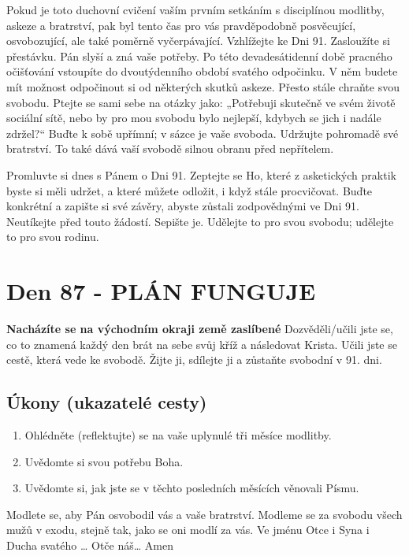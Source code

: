 \documentclass[11pt]{article}
\newcommand{\zacatekTrinactyTyden}{
\textbf{Nacházíte se na východním okraji země zaslíbené} \newline 
Dozvěděli/učili jste se, co to znamená každý den brát na sebe svůj kříž a následovat Krista. Učili jste se cestě, která vede ke svobodě. Žijte ji, sdílejte ji a zůstaňte svobodní v 91. dni.

\subsection*{Úkony (ukazatelé cesty)}
\begin{enumerate}
  \item Ohlédněte (reflektujte) se na vaše uplynulé tři měsíce modlitby.
  \item Uvědomte si svou potřebu Boha.
  \item Uvědomte si, jak jste se v těchto posledních měsících věnovali Písmu.
\end{enumerate}
Modlete se, aby Pán osvobodil vás a vaše bratrství. \newline
Modleme se za svobodu všech mužů v exodu, stejně tak, jako se oni modlí za vás.\newline
Ve jménu Otce i Syna i Ducha svatého …  Otče náš… Amen
}
\begin{document}
Pokud je toto duchovní cvičení vaším prvním setkáním s disciplínou modlitby, askeze a bratrství, pak byl tento čas pro vás
pravděpodobně posvěcující, osvobozující, ale také poměrně vyčerpávající. Vzhlížejte ke Dni 91. Zasloužíte si přestávku. Pán slyší
a zná vaše potřeby. Po této devadesátidenní době pracného očišťování vstoupíte do dvoutýdenního období svatého odpočinku.
V něm budete mít možnost odpočinout si od některých skutků askeze. Přesto stále chraňte svou svobodu. Ptejte se sami sebe na
otázky jako: „Potřebuji skutečně ve svém životě sociální sítě, nebo by pro mou svobodu bylo nejlepší, kdybych se jich i nadále
zdržel?“ Buďte k sobě upřímní; v sázce je vaše svoboda. Udržujte pohromadě své bratrství. To také dává vaší svobodě silnou
obranu před nepřítelem.

Promluvte si dnes s Pánem o Dni 91. Zeptejte se Ho, které z asketických praktik byste si měli udržet, a které můžete odložit, i když
stále procvičovat. Buďte konkrétní a zapište si své závěry, abyste zůstali zodpovědnými ve Dni 91. Neutíkejte před touto žádostí.
Sepište je. Udělejte to pro svou svobodu; udělejte to pro svou rodinu.


\newpage
\section{Den 87 - PLÁN FUNGUJE}
\zacatekTrinactyTyden
\end{document}
